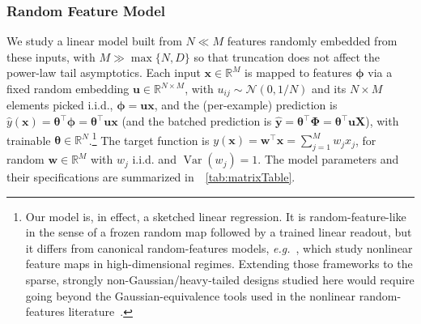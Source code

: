 \documentclass[11pt]{article}
\theoremstyle{plain}
\theoremstyle{definition}
\theoremstyle{remark}
\newcommand{\JSCheck}[1]{#1}
\begin{document}
\subsubsection{Random Feature Model}
We study a linear model built from \( N \ll M \)  features randomly embedded from these inputs\JSCheck{, with $M\gg\max\{N,D\}$ so that truncation does not affect the power-law tail asymptotics.}  Each input $\mathbf{x}\in\mathbb{R}^M$ is mapped to features $\boldsymbol{\phi}$ via a fixed random embedding $\mathbf{u} \in\mathbb{R}^{N\times M}$, with  $u_{ij} \sim \mathcal{N}(0, 1/N)$ and its $N\times M$ elements picked i.i.d., $\boldsymbol{\phi} = \mathbf{u} \mathbf{x}$, and the (per-example) prediction is $\hat y(\mathbf{x})=\boldsymbol{\theta}^\top \boldsymbol{\phi}=\boldsymbol{\theta}^\top \mathbf{u} \mathbf{x}$ (and the batched prediction is $\hat{\mathbf{y}} =\boldsymbol{\theta}^\top \boldsymbol{\Phi}=\boldsymbol{\theta}^\top \mathbf{u} \mathbf{X}$), with trainable $\boldsymbol{\theta}\in\mathbb{R}^N$.\footnote{\JSCheck{Our model is, in effect, a sketched linear regression. It is random-feature-like in the sense of a frozen random map followed by a trained linear readout, but it differs from canonical random-features models, \textit{e.g.}~\cite{hastie2022surprises,gerace2020generalisation,goldt2020hiddenmanifold}, which study nonlinear feature maps in high-dimensional regimes. Extending those frameworks to the sparse, strongly non-Gaussian/heavy-tailed designs studied here would require going beyond the Gaussian-equivalence tools used in  the nonlinear random-features literature~\cite{hu2022universality,mei2022rf,GoldtEtAl2022GaussianEquivalence}.}} The target function is $y(\mathbf{x})=\mathbf{w}^\top \mathbf{x}=\sum_{j=1}^M w_j x_j$, for random $\mathbf{w}\in\mathbb{R}^M$ with $w_j$ i.i.d. and $\operatorname{Var}(w_j)=1$.  The model parameters and their specifications are summarized in~\tableautorefname~\ref{tab:matrixTable}.
\end{document}
